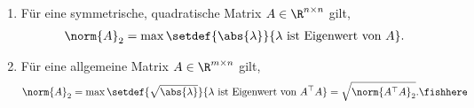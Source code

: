 \begin{prop}
\label{prop:2.10}
\begin{enumerate}[label=(\roman{*})]
  \item\label{prop:2.10:1} Für eine symmetrische, quadratische Matrix
  $A\in\R^{n\times n}$ gilt,
\begin{align*}
\norm{A}_2 = \max\setdef{\abs{\lambda}}{\lambda\text{ ist Eigenwert von }A}.
\end{align*}
  \item\label{prop:2.10:2} Für eine allgemeine Matrix $A\in\R^{m\times n}$
  gilt,
\begin{align*}
\norm{A}_2 = \max\setdef{\sqrt{\abs{\lambda}}}{\lambda\text{ ist Eigenwert von
}A^\top A} = \sqrt{\norm{A^\top A}_2}.\fishhere
\end{align*}
\end{enumerate}
\end{prop}
